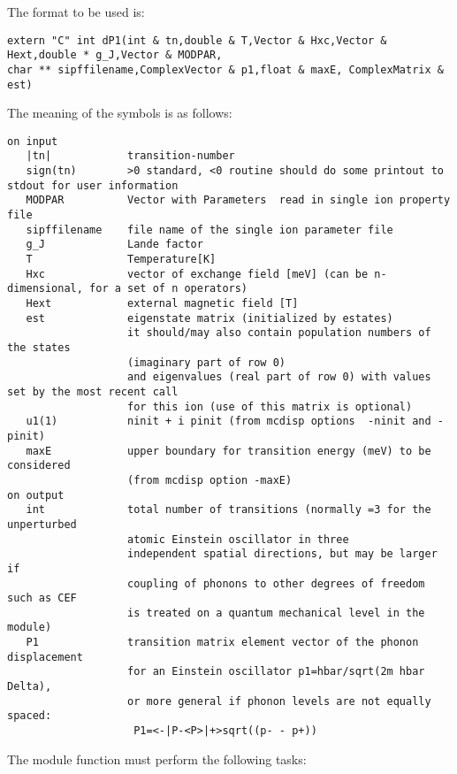 The format to be used is:
{\footnotesize
\begin{verbatim}
extern "C" int dP1(int & tn,double & T,Vector & Hxc,Vector & Hext,double * g_J,Vector & MODPAR,
char ** sipffilename,ComplexVector & p1,float & maxE, ComplexMatrix & est)
\end{verbatim}

The meaning of the symbols is as follows:

\begin{verbatim}
on input
   |tn|            transition-number  
   sign(tn)        >0 standard, <0 routine should do some printout to stdout for user information
   MODPAR          Vector with Parameters  read in single ion property file
   sipffilename    file name of the single ion parameter file
   g_J             Lande factor
   T               Temperature[K]
   Hxc             vector of exchange field [meV] (can be n-dimensional, for a set of n operators)
   Hext            external magnetic field [T]
   est             eigenstate matrix (initialized by estates)
                   it should/may also contain population numbers of the states
				   (imaginary part of row 0)
                   and eigenvalues (real part of row 0) with values set by the most recent call
				   for this ion (use of this matrix is optional)
   u1(1)           ninit + i pinit (from mcdisp options  -ninit and -pinit)
   maxE            upper boundary for transition energy (meV) to be considered
                   (from mcdisp option -maxE)
on output
   int             total number of transitions (normally =3 for the unperturbed 
                   atomic Einstein oscillator in three 
                   independent spatial directions, but may be larger if
                   coupling of phonons to other degrees of freedom such as CEF
                   is treated on a quantum mechanical level in the module)                   
   P1              transition matrix element vector of the phonon displacement
                   for an Einstein oscillator p1=hbar/sqrt(2m hbar Delta), 
                   or more general if phonon levels are not equally spaced:
                    P1=<-|P-<P>|+>sqrt((p- - p+))                                           
\end{verbatim}
}
The module function must perform the following tasks:
